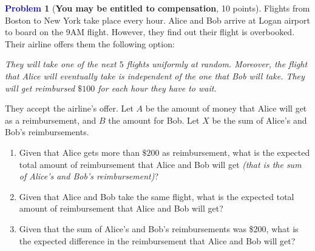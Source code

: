 \documentclass[letterpaper,11pt]{article}
\theoremstyle{plain}
\theoremstyle{definition}
\newtheorem{problem}{\textcolor{blue}{Problem}}
\theoremstyle{plain}
\begin{document}
\begin{problem}[\textbf{You may be entitled to compensation}, 10 points]
Flights from Boston to New York take place every hour. Alice and Bob arrive at Logan airport to board on the 9AM flight. However, they find out their flight is overbooked. Their airline offers them  the following option:
    
    \textit{They will take one of the next $5$ flights uniformly at random. Moreover, the flight that Alice will eventually take is independent of the one that Bob will take. They will get reimbursed  $\$100$ for each hour they have to wait.} 
    
    They accept the airline's offer. Let $A$ be the amount of money that Alice will get as a reimbursement, and $B$ the amount for Bob. Let $X$ be the sum of Alice's and Bob's reimbursements.
    
    \begin{enumerate} [label=(\alph*)]
        \item Given that Alice gets more than $\$200$ as reimbursement, what is the expected total amount of reimbursement that Alice and Bob will get \textit{(that is the sum of Alice's and Bob's reimbursement)}?
        
        \item Given that Alice and Bob take the same flight, what is the expected total amount of reimbursement that Alice and Bob will get?  
        
        \item Given that the sum of Alice's and Bob's reimbursements was \$200, what is the expected difference in the reimbursement that Alice and Bob will get?

    \end{enumerate}
\end{problem}
\end{document}
